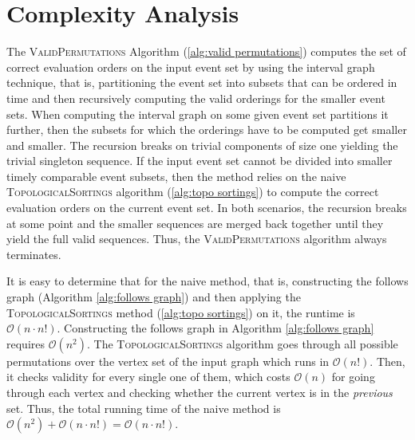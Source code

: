 \section{Complexity Analysis}
The \textsc{ValidPermutations} Algorithm (\ref{alg:valid permutations}) computes the set of correct evaluation orders on the input event set by using the interval graph technique, that is, partitioning the event set into subsets that can be ordered in time and then recursively computing the valid orderings for the smaller event sets.
When computing the interval graph on some given event set partitions it further, then the subsets for which the orderings have to be computed get smaller and smaller.
The recursion breaks on trivial components of size one yielding the trivial singleton sequence.
If the input event set cannot be divided into smaller timely comparable event subsets, then the method relies on the naive \textsc{TopologicalSortings} algorithm (\ref{alg:topo sortings}) to compute the correct evaluation orders on the current event set.
In both scenarios, the recursion breaks at some point and the smaller sequences are merged back together until they yield the full valid sequences.
Thus, the \textsc{ValidPermutations} algorithm always terminates.

It is easy to determine that for the naive method, that is, constructing the follows graph (Algorithm \ref{alg:follows graph}) and then applying the \textsc{TopologicalSortings} method (\ref{alg:topo sortings}) on it, the runtime is $\mathcal{O}(n \cdot n!)$.
Constructing the follows graph in Algorithm \ref{alg:follows graph} requires $\mathcal{O}(n^2)$.
The \textsc{TopologicalSortings} algorithm goes through all possible permutations over the vertex set of the input graph which runs in $\mathcal{O}(n!)$.
Then, it checks validity for every single one of them, which costs $\mathcal{O}(n)$ for going through each vertex and checking whether the current vertex is in the \textit{previous} set.
Thus, the total running time of the naive method is $\mathcal{O}(n^2) + \mathcal{O}(n \cdot n!) = \mathcal{O}(n \cdot n!)$.

